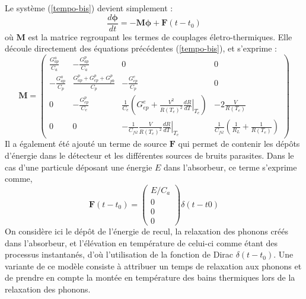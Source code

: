 Le système (\ref{tempo-bis}) devient simplement :
\begin{equation}
\label{ode-mat}
\frac{d \bm{\phi}}{d t}= - \bm{M} \bm{\phi} + \bm{F}(t-t_0)
\end{equation}
où $\bm{M}$ est la matrice regroupant les termes de couplages életro-thermiques. Elle découle directement des équations précédentes (\ref{tempo-bis}), et s'exprime :
\begin{equation}
\label{coupling-mat-temp}
\bm{M} = 
\left( \begin{array}{cccc}
 \frac{G_{ap}^a}{C_a}&-\frac{G_{ap}^p}{C_a}&0&0 \\
 -\frac{G_{ap}^a}{C_p}&\frac{G_{ap}^p+G_{ep}^p+G_{pb}^p}{C_p}&-\frac{G_{ep}^e}{C_p}&0 \\
0&-\frac{G_{ep}^p}{C_e}&\frac{1}{C_e}\left(G_{ep}^e + \frac{V^2}{R(T_e)^2}  \left.\frac{d R}{d T}\right\vert_{T_e} \right)&-2\frac{V}{R(T_e)}\\
0&0&-\frac{1}{C_{fil}}\frac{V}{R(T_e)^2} \left.\frac{d R}{d T}\right\vert_{T_e} &\frac{1}{C_{fil}}\left( \frac{1}{R_L} + \frac{1}{R(T_e)} \right)
\end{array} \right)
\end{equation}
Il a également été ajouté un terme de source $\bm{F}$ qui permet de contenir les dépôts d'énergie dans le détecteur et les différentes sources de bruits parasites. Dans le cas d'une particule déposant une énergie $E$ dans l'absorbeur, ce terme s'exprime comme,
\begin{equation}
\bm{F}(t-t_0) = 
\left( \begin{array}{c}
E/C_a \\
0 \\
0 \\
0
\end{array} \right) \delta (t-t0)
\end{equation}
On considère ici le dépôt de l'énergie de recul, la relaxation des phonons créés dans l'absorbeur, et l'élévation en température de celui-ci comme étant des processus instantanés, d'où l'utilisation de la fonction de Dirac $\delta (t-t_0)$. Une variante de ce modèle consiste à attribuer un temps de relaxation aux phonons et de prendre en compte la montée en température des bains thermiques lors de la relaxation des phonons.


